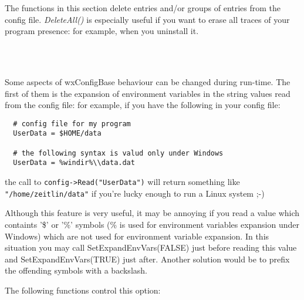 
The functions in this section delete entries and/or groups of entries from the
config file. {\it DeleteAll()} is especially useful if you want to erase all
traces of your program presence: for example, when you uninstall it.

\\
\\


Some aspects of wxConfigBase behaviour can be changed during run-time. The
first of them is the expansion of environment variables in the string values
read from the config file: for example, if you have the following in your
config file:

\begin{verbatim}
  # config file for my program
  UserData = $HOME/data

  # the following syntax is valud only under Windows
  UserData = %windir%\\data.dat
\end{verbatim}

the call to \verb$config->Read("UserData")$ will return something like
\verb$"/home/zeitlin/data"$ if you're lucky enough to run a Linux system ;-)

Although this feature is very useful, it may be annoying if you read a value
which containts '\$' or '\%' symbols (\% is used for environment variables
expansion under Windows) which are not used for environment variable
expansion. In this situation you may call SetExpandEnvVars(FALSE) just before
reading this value and SetExpandEnvVars(TRUE) just after. Another solution
would be to prefix the offending symbols with a backslash.

The following functions control this option:

\\
\\
\\


